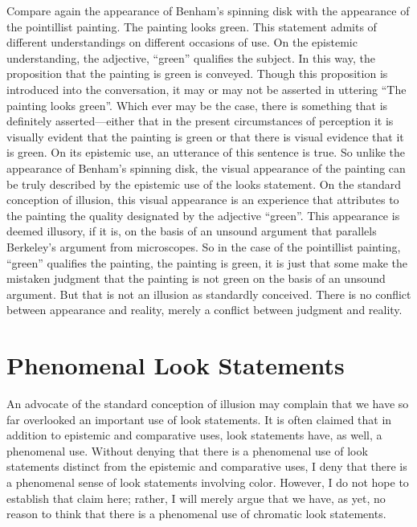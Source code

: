 \documentclass[12pt]{article}
\begin{document}
Compare again the appearance of Benham's spinning disk with the appearance of the pointillist painting. The painting looks green. This statement admits of different understandings on different occasions of use. On the epistemic understanding, the adjective, ``green'' qualifies the subject. In this way, the proposition that the painting is green is conveyed. Though this proposition is introduced into the conversation, it may or may not be asserted in uttering ``The painting looks green''. Which ever may be the case, there is something that is definitely asserted---either that in the present circumstances of perception it is visually evident that the painting is green or that there is visual evidence that it is green. On its epistemic use, an utterance of this sentence is true. So unlike the appearance of Benham's spinning disk, the visual appearance of the painting can be truly described by the epistemic use of the looks statement. On the standard conception of illusion, this visual appearance is an experience that attributes to the painting the quality designated by the adjective ``green''. This appearance is deemed illusory, if it is, on the basis of an unsound argument that parallels Berkeley's argument from microscopes. So in the case of the pointillist painting, ``green'' qualifies the painting, the painting is green, it is just that some make the mistaken judgment that the painting is not green on the basis of an unsound argument. But that is not an illusion as standardly conceived. There is no conflict between appearance and reality, merely a conflict between judgment and reality.


\section{Phenomenal Look Statements}\label{sec:phenomenal_look_statements} %

An advocate of the standard conception of illusion may complain that we have so far overlooked an important use of look statements. It is often claimed that in addition to epistemic and comparative uses, look statements have, as well, a phenomenal use. Without denying that there is a phenomenal use of look statements distinct from the epistemic and comparative uses, I deny that there is a phenomenal sense of look statements involving color. However, I do not hope to establish that claim here; rather, I will merely argue that we have, as yet, no reason to think that there is a phenomenal use of chromatic look statements.
\end{document}
